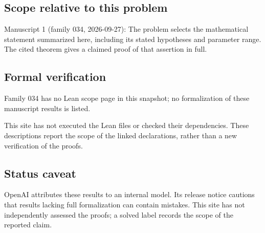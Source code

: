 \documentclass[11pt]{article}
\begin{document}
\subsection{Scope relative to this problem}
Manuscript 1 (family 034, 2026-09-27): The problem selects the mathematical statement summarized here, including its stated hypotheses and parameter range. The cited theorem gives a claimed proof of that assertion in full.

\subsection{Formal verification}
Family 034 has no Lean scope page in this snapshot; no formalization of these manuscript results is listed.

This site has not executed the Lean files or checked their dependencies. These descriptions report the scope of the linked declarations, rather than a new verification of the proofs.

\subsection{Status caveat}
OpenAI attributes these results to an internal model. Its release notice cautions that results lacking full formalization can contain mistakes. This site has not independently assessed the proofs; a solved label records the scope of the reported claim.
\end{document}
